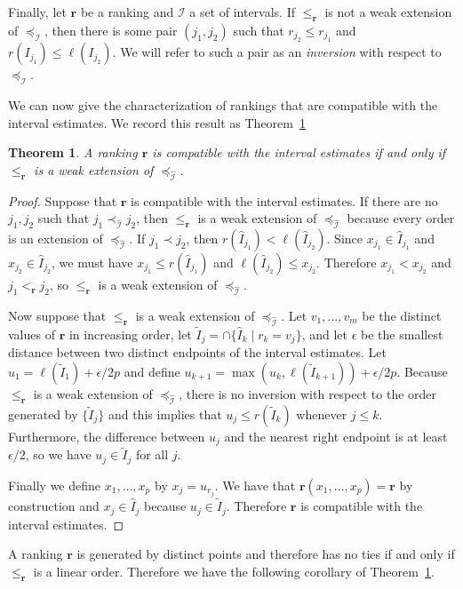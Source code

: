 \documentclass[12pt]{article}
\newcommand{\iord}{{\preceq_{\hat{\mathcal{I}}}}}
\newcommand{\rord}[1][\mathbf{r}]{{\leqslant_{#1}}}
\newcommand{\iords}{{\prec_{\hat{\mathcal{I}}}}}
\newcommand{\rords}[1][\mathbf{r}]{{<_{#1}}}
\newtheorem{theorem}{Theorem}
\numberwithin{theorem}{section}
\begin{document}
Finally, let $\mathbf{r}$ be a ranking and $\mathcal{I}$ a set of intervals.  If $\rord$ is not a weak extension of $\preceq_{\mathcal{I}}$, then there is some pair $(j_1, j_2)$ such that $r_{j_2} \leq r_{j_1}$ and $r(I_{j_1}) \leq \ell(I_{j_2})$.  We will refer to such a pair as an \emph{inversion} with respect to $\preceq_{\mathcal{I}}$.

We can now give the characterization of rankings that are compatible with the interval estimates.  We record this result as Theorem~\ref{thm_main}

\begin{theorem}
\label{thm_main}
A ranking $\mathbf{r}$ is compatible with the interval estimates if and only if $\rord$ is a weak extension of $\iord$.
\end{theorem}
\begin{proof}
Suppose that $\mathbf{r}$ is compatible with the interval estimates.  If there are no $j_1, j_2$ such that $j_1 \iords j_2$, then $\rord$ is a weak extension of $\iord$ because every order is an extension of $\iord$.  If $j_1 \prec j_2$, then $r(\hat{I}_{j_1}) < \ell(\hat{I}_{j_2})$.  Since $x_{j_1} \in \hat{I}_{j_1}$ and $x_{j_2} \in \hat{I}_{j_2}$, we must have $x_{j_1} \leq r(\hat{I}_{j_1})$ and $\ell(\hat{I}_{j_2}) \leq x_{j_2}$.  Therefore $x_{j_1} < x_{j_2}$ and $j_1 \rords j_2$, so $\rord$ is a weak extension of $\iord$.

Now suppose that $\rord$ is a weak extension of $\iord$.  Let $v_1, \dots, v_m$ be the distinct values of $\mathbf{r}$ in increasing order, let $\tilde{I}_j = \cap\{\hat{I}_k \mid r_k = v_j\}$, and let $\epsilon$ be the smallest distance between two distinct endpoints of the interval estimates.  Let $u_1 = \ell(\tilde{I}_1) + \epsilon / 2p$ and define $u_{k + 1} = \max(u_k, \ell(\tilde{I}_{k + 1})) + \epsilon / 2p$.  Because $\rord$ is a weak extension of $\iord$, there is no inversion with respect to the order generated by $\{\tilde{I}_j\}$ and this implies that $u_j \leq r(\tilde{I}_k)$ whenever $j \leq k$.  Furthermore, the difference between $u_j$ and the nearest right endpoint is at least $\epsilon / 2$, so we have $u_j \in \tilde{I}_j$ for all $j$.

Finally we define $x_1, \dots, x_p$ by $x_j = u_{r_j}$.  We have that $\mathbf{r}(x_1, \dots, x_p) = \mathbf{r}$ by construction and $x_j \in \hat{I}_j$ because $u_j \in \tilde{I}_j$.  Therefore $\mathbf{r}$ is compatible with the interval estimates.
\end{proof}

A ranking $\mathbf{r}$ is generated by distinct points and therefore has no ties if and only if $\rord$ is a linear order.  Therefore we have the following corollary of Theorem~\ref{thm_main}.
\end{document}
